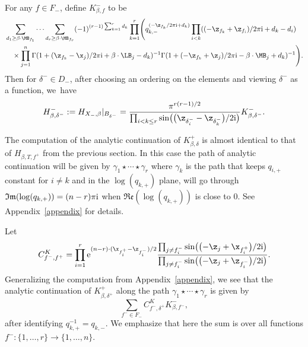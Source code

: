 For any $f \in F_-$, define
 $K^{-}_{\beta, f}$ to be
\begin{align*}
&\sum_{d_1 \geq \beta \cdot \MB_{f_1}} \cdots \sum _{d_r \geq \beta \cdot \MB_{f_r}} (-1)^{(r-1) \sum_{k=1}^r d_k}\prod_{k=1}^r \Biggl(q_{k, -}^{(- \z_{f_k}/2\pi {\rm i} + d_k)}
\prod_{i < k} ( (- \z_{f_k} + \z_{f_i} )/2 \pi {\rm i} + d_k - d_i )
 \\
&\quad{}\times \prod_{j=1}^n\Gamma (1+ ( \z_{f_k}-\x_j )/2 \pi {\rm i}+\beta\cdot \LB_j-d_k )^{-1}\Gamma (1+ (-\z_{f_k}+\z_j )/2 \pi {\rm i}-\beta\cdot \MB_j+d_k )^{-1}\Biggr).
\end{align*}
Then for $\delta^- \in D_-$, after choosing an ordering on the elements and viewing $\delta^-$ as a function, we~have
\begin{equation}\label{HBM}
 H^{-}_{\beta, \delta^-} := H_{X_-, \beta}|_{B_{\delta^-}} =
\frac{\pi^{r(r-1)/2}}{\prod_{i<k\leq r} \sin\bigl(\bigl(\z_{\delta^-_i} - \z_{\delta^-_k}\bigr)/2{\rm i}\bigr)} K^{-}_{\beta, \delta^-}.
\end{equation}



The computation of the analytic continuation of $K_{\beta,\delta}^{+}$ is almost identical to that of $H_{\beta, T, f^+}$ from the previous section.
In this case the path of analytic continuation will be given by $\gamma_1 \star \cdots \star \gamma_r$ where
$\gamma_k$
is the path that keeps $q_{i, +}$ constant for $i \neq k$ and in the
 $\log(q_{k, +})$ plane, will go through $\mathfrak{Im}(\log(q_{k, +})) = (n-r)\pi {\rm i}$ when $\mathfrak{Re}(\log(q_{k,+}))$ is close to 0. See Appendix~\ref{appendix} for details.

Let
\[
C^K_{f^-, f^+} = \prod_{i=1}^r {\rm e}^{ (n-r)\cdot ( \x_{f^+_i}-\z_{f^-_i})/2 }\frac{ \prod_{j\neq {f^-_i}} \sin\bigl( \bigl(-\z_j+\x_{f^+_i}\bigr)/2 {\rm i}\bigr) }{\prod_{j \neq {f^-_i}}\sin\bigl(\bigl(-\z_j + \z_{f^-_i}\bigr)/2 {\rm i}\bigr)}.
\]
Generalizing the computation from Appendix~\ref{appendix},
we see that the analytic continuation of $K^{+}_{\beta, \delta^+}$ along the path
$\gamma_1 \star \cdots \star \gamma_r$ is given by
\begin{equation}\label{ancon}\sum_{f^- \in F_-} C^K_{f^-, \delta^+} K^{-}_{\beta, f^-},\end{equation}
after identifying $q_{k, +}^{-1} = q_{k, -}$. We emphasize that here the sum is over all functions $f^-\colon \{1, \dots, r\} \allowbreak \to \{1, \dots, n\}$.

